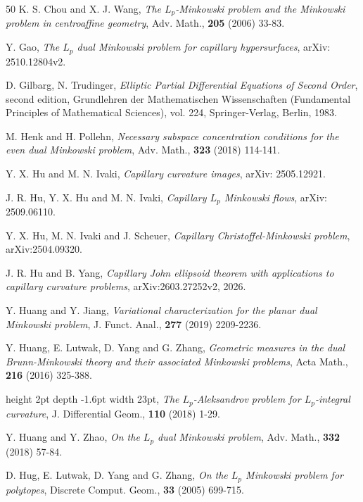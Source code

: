 \documentclass[11pt]{amsart}
\numberwithin{equation} {section}
\numberwithin{equation}{section}
\begin{document}
\begin{thebibliography}{50}
K. S. Chou and X. J. Wang, \emph{The $L_p$-Minkowski problem and the Minkowski problem in centroaffine geometry}, Adv. Math., {\bf 205} (2006) 33-83.

 Y. Gao, \emph{The $L_p$ dual Minkowski problem for capillary hypersurfaces}, arXiv: 2510.12804v2.

 D. Gilbarg, N. Trudinger, \emph{Elliptic Partial Differential Equations of Second Order}, second edition, Grundlehren der Mathematischen Wissenschaften (Fundamental Principles of Mathematical Sciences), vol. 224, Springer-Verlag, Berlin, 1983. 


M. Henk and H. Pollehn, \emph{Necessary subspace concentration conditions for the even dual Minkowski problem}, Adv. Math., {\bf 323} (2018) 114-141.

 Y. X. Hu and M. N. Ivaki, \emph{Capillary curvature images}, arXiv: 2505.12921.

 J. R. Hu, Y. X. Hu and M. N. Ivaki, \emph{Capillary $L_p$ Minkowski flows}, arXiv: 2509.06110.

 Y. X. Hu, M. N. Ivaki and J. Scheuer, \emph{Capillary Christoffel-Minkowski problem}, arXiv:2504.09320.

 J. R. Hu and B. Yang, \emph{Capillary John ellipsoid theorem with applications to capillary curvature problems}, arXiv:2603.27252v2, 2026.

Y. Huang and Y. Jiang, \emph{Variational characterization for the planar dual Minkowski problem}, J. Funct. Anal., {\bf 277} (2019) 2209-2236.

Y. Huang, E. Lutwak, D. Yang and G. Zhang, \emph{Geometric measures in the dual Brunn-Minkowski theory and their associated Minkowski
  problems}, Acta Math., {\bf 216} (2016) 325-388.

\leavevmode\vrule height 2pt depth -1.6pt width 23pt, \emph{The $L_p$-Aleksandrov problem for $L_p$-integral curvature}, J. Differential Geom., {\bf 110} (2018) 1-29.

Y. Huang and Y. Zhao, \emph{On the $L_p$ dual Minkowski problem}, Adv. Math., {\bf 332} (2018) 57-84.

D. Hug, E. Lutwak, D. Yang and G. Zhang, \emph{On the $L_p$ Minkowski problem for polytopes}, Discrete Comput. Geom., {\bf 33} (2005) 699-715.


\end{thebibliography}
\end{document}
